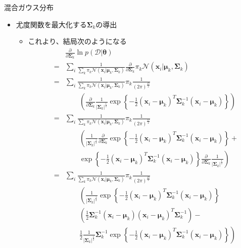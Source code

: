 \documentclass[dvipdfmx,notheorems,t]{beamer}
\begin{document}
\begin{frame}{混合ガウス分布}

\begin{itemize}
	\item 尤度関数を最大化する$\bm{\Sigma}_k$の導出
	\begin{itemize}		
		\item これより、結局次のようになる
		\begin{eqnarray}
			&& \frac{\partial}{\partial \bm{\Sigma}_k} \ln p(\mathcal{D} | \bm{\theta}) \nonumber \\
			&=& \sum_i \frac{1}{\sum_k \pi_k \mathcal{N}(\bm{x}_i | \bm{\mu}_k, \bm{\Sigma}_k)} \frac{\partial}{\partial \bm{\Sigma}_k} \pi_k \mathcal{N}(\bm{x}_i | \bm{\mu}_k, \bm{\Sigma}_k) \nonumber \\
			&=& \sum_i \frac{1}{\sum_k \pi_k \mathcal{N}(\bm{x}_i | \bm{\mu}_k, \bm{\Sigma}_k)} \pi_k \frac{1}{(2\pi)^\frac{D}{2}} \nonumber \\
			&& \qquad \left( \frac{\partial}{\partial \bm{\Sigma}_k} \frac{1}{|\bm{\Sigma}_k|^\frac{1}{2}} \exp \left\{ - \frac{1}{2} (\bm{x}_i - \bm{\mu}_k)^T \bm{\Sigma}_k^{-1} (\bm{x}_i - \bm{\mu}_k) \right\} \right) \nonumber \\
			&=& \sum_i \frac{1}{\sum_k \pi_k \mathcal{N}(\bm{x}_i | \bm{\mu}_k, \bm{\Sigma}_k)} \pi_k \frac{1}{(2\pi)^\frac{D}{2}} \nonumber \\
			&& \qquad \left( \frac{1}{|\bm{\Sigma}_k|^\frac{1}{2}} \frac{\partial}{\partial \bm{\Sigma}_k} \exp \left\{ - \frac{1}{2} (\bm{x}_i - \bm{\mu}_k)^T \bm{\Sigma}_k^{-1} (\bm{x}_i - \bm{\mu}_k) \right\} + \right. \nonumber \\
			&& \qquad \left. \exp \left\{ - \frac{1}{2} (\bm{x}_i - \bm{\mu}_k)^T \bm{\Sigma}_k^{-1} (\bm{x}_i - \bm{\mu}_k) \right\} \frac{\partial}{\partial \bm{\Sigma}_k} \frac{1}{|\bm{\Sigma}_k|^\frac{1}{2}} \right) \nonumber \\
			&=& \sum_i \frac{1}{\sum_k \pi_k \mathcal{N}(\bm{x}_i | \bm{\mu}_k, \bm{\Sigma}_k)} \pi_k \frac{1}{(2\pi)^\frac{D}{2}} \nonumber \\
			&& \qquad \left( \frac{1}{|\bm{\Sigma}_k|^\frac{1}{2}} \exp \left\{ - \frac{1}{2} (\bm{x}_i - \bm{\mu}_k)^T \bm{\Sigma}_k^{-1} (\bm{x}_i - \bm{\mu}_k) \right\} \right. \nonumber \\
			&& \qquad \left( \frac{1}{2} \bm{\Sigma}_k^{-1} (\bm{x}_i - \bm{\mu}_k) (\bm{x}_i - \bm{\mu}_k)^T \bm{\Sigma}_k^{-1} \right) - \nonumber \\
			&& \qquad \left. \frac{1}{2} \frac{1}{|\bm{\Sigma}_k|^\frac{1}{2}} \bm{\Sigma}_k^{-1} \exp \left\{ - \frac{1}{2} (\bm{x}_i - \bm{\mu}_k)^T \bm{\Sigma}_k^{-1} (\bm{x}_i - \bm{\mu}_k) \right\} \right) \nonumber \\

\end{eqnarray}
\end{itemize}
\end{itemize}
\end{frame}
\end{document}
